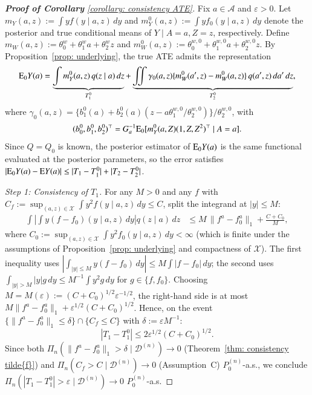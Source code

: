 \begin{proof}[\hypertarget{proof of corollary}{\textbf{Proof of Corollary}} \ref{corollary: consistency ATE}]
Fix $a\in\mathcal{A}$ and $\varepsilon>0$. Let $m_Y(a,z):=\int y f(y\mid a,z)\,dy$ and $m_Y^0(a,z):=\int y f_0(y\mid a,z)\,dy$ denote the posterior and true conditional means of $Y\mid A=a,Z=z$, respectively. Define $m_W(a,z):=\theta_0^w+\theta_1^w a+\theta_2^w z$ and $m_W^0(a,z):=\theta_0^{w,0}+\theta_1^{w,0}a+\theta_2^{w,0}z$. By Proposition~\ref{prop: underlying}, the true ATE admits the representation
\[
\mathrm{E}_0 Y(a)
=
\underbrace{\int m_Y^0(a,z)\,q(z\mid a)\,dz}_{T_1^0}
+
\underbrace{\iint \gamma_0(a,z)\{m_W^0(a',z)-m_W^0(a,z)\}\,q(a',z)\,da'\,dz}_{T_2^0},
\]
where $\gamma_0(a,z)=\{b_1^0(a)+b_2^0(a)(z-a\theta_1^{w,0}/\theta_2^{w,0})\}/\theta_2^{w,0}$, with 
$$(b_0^0,b_1^0,b_2^0)^\top = G_a^{-1}\mathrm{E}_0[m_Y^0(a,Z)(1,Z,Z^2)^\top\mid A=a].$$ 
Since $Q=Q_0$ is known, the posterior estimator of $\mathrm{E}_0 Y(a)$ is the same functional evaluated at the posterior parameters, so the error satisfies $|\mathrm{E}_0 Y(a)-\mathrm{E} Y(a)|\leq |T_1-T_1^0|+|T_2-T_2^0|$.

\medskip
\noindent\textit{Step 1: Consistency of $T_1$.}
For any $M>0$ and any $f$ with $C_f:=\sup_{(a,z)\in\mathcal{X}}\int y^2 f(y\mid a,z)\,dy\leq C$, split the integrand at $|y|\leq M$:
\begin{align*}
\int\!\left|\int y(f-f_0)(y\mid a,z)\,dy\right|q(z\mid a)\,dz
&\leq M\,\|f^a-f_0^a\|_1 + \frac{C+C_0}{M},
\end{align*}
where $C_0:=\sup_{(a,z)\in\mathcal{X}}\int y^2 f_0(y\mid a,z)\,dy<\infty$ (which is finite under the assumptions of Proposition~\ref{prop: underlying} and compactness of $\mathcal{X}$). The first inequality uses $|\int_{|y|\leq M} y(f-f_0)\,dy|\leq M\int|f-f_0|\,dy$; the second uses $\int_{|y|>M}|y|g\,dy\leq M^{-1}\int y^2 g\,dy$ for $g\in\{f,f_0\}$. Choosing $M=M(\varepsilon):=(C+C_0)^{1/2}\varepsilon^{-1/2}$, the right-hand side is at most $M\|f^a-f_0^a\|_1 + \varepsilon^{1/2}(C+C_0)^{1/2}$. Hence, on the event $\{\|f^a-f_0^a\|_1 \leq \delta\}\cap\{C_f\leq C\}$ with $\delta:=\varepsilon M^{-1}$:
\[
|T_1-T_1^0|\leq 2\varepsilon^{1/2}(C+C_0)^{1/2}.
\]
Since both $\Pi_n(\|f^a-f_0^a\|_1>\delta\mid\mathcal{D}^{(n)})\to 0$ (Theorem~\ref{thm: consistency tilde{f}}) and $\Pi_n(C_f>C\mid\mathcal{D}^{(n)})\to 0$ (Assumption~C) $P_0^{(n)}$-a.s., we conclude $\Pi_n(|T_1-T_1^0|>\varepsilon\mid\mathcal{D}^{(n)})\to 0$ $P_0^{(n)}$-a.s.


\end{proof}
